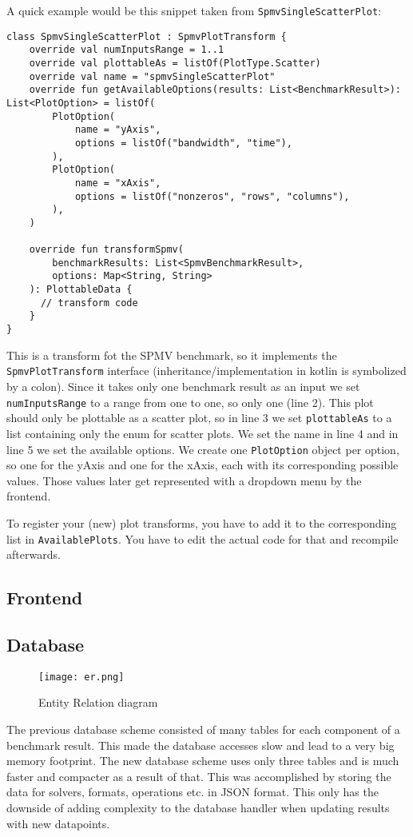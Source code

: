 A quick example would be this snippet taken from \texttt{SpmvSingleScatterPlot}:

\begin{lstlisting}[style=JAVA]
class SpmvSingleScatterPlot : SpmvPlotTransform {
    override val numInputsRange = 1..1
    override val plottableAs = listOf(PlotType.Scatter)
    override val name = "spmvSingleScatterPlot"
    override fun getAvailableOptions(results: List<BenchmarkResult>): List<PlotOption> = listOf(
        PlotOption(
            name = "yAxis",
            options = listOf("bandwidth", "time"),
        ),
        PlotOption(
            name = "xAxis",
            options = listOf("nonzeros", "rows", "columns"),
        ),
    )

    override fun transformSpmv(
        benchmarkResults: List<SpmvBenchmarkResult>,
        options: Map<String, String>
    ): PlottableData {
      // transform code
    }
}
\end{lstlisting}

This is a transform fot the SPMV benchmark, so it implements the \texttt{SpmvPlotTransform} interface (inheritance/implementation in kotlin is symbolized by a colon). Since it takes only one benchmark result as an input we set \texttt{numInputsRange} to a range from one to one, so only one (line 2). This plot should only be plottable as a scatter plot, so in line 3 we set \texttt{plottableAs} to a list containing only the enum for scatter plots. We set the name in line 4 and in line 5 we set the available options. We create one \texttt{PlotOption} object per option, so one for the yAxis and one for the xAxis, each with its corresponding possible values. Those values later get represented with a dropdown menu by the frontend.

To register your (new) plot transforms, you have to add it to the corresponding list in \texttt{AvailablePlots}. You have to edit the actual code for that and recompile afterwards.

\subsection{Frontend}

\subsection{Database}  

\begin{figure}[H]
	\centering
	\texttt{[image: er.png]}
	\caption{Entity Relation diagram}
  \label{fig:er}
\end{figure}

The previous database scheme consisted of many tables for each component of a benchmark result. This made the database accesses slow and lead to a very big memory footprint. The new database scheme uses only three tables and is much faster and compacter as a result of that. This was accomplished by storing the data for solvers, formats, operations etc. in JSON format. This only has the downside of adding complexity to the database handler when updating results with new datapoints.
